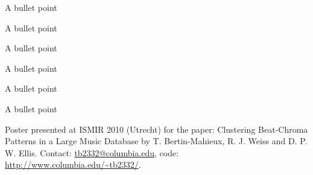 \documentclass[portrait,a0b,final]{a0poster}
\newenvironment{poster}{
  \begin{center}
  \begin{minipage}[c]{0.98\textwidth}
}{
  \end{minipage} 
  \end{center}
}
\newcommand{\pbox}[4]{
\psshadowbox[#3]{
\begin{minipage}[t][#2][t]{#1}
#4
\end{minipage}
}}
\begin{document}
\begin{poster}
\begin{multicols}{3}
\begin{list}{}{\leftmargin=2em =1em}
\item A bullet point
\item A bullet point
\item A bullet point
\item A bullet point
\end{list}


\vspace{0cm}
\begin{center}
  \pbox{0.8\columnwidth}{}{linewidth=2mm,framearc=0.1,linecolor=lightred,fillstyle=gradient,gradangle=0,gradbegin=white,gradend=whitepink,gradmidpoint=1.0,framesep=1em}{
    \begin{center}
      \large Conclusion
    \end{center}}
\end{center}

\vspace{1.0cm}

\begin{list}{}{\leftmargin=2em =1em}
\item A bullet point
\item A bullet point
\end{list}




\begin{small}


\end{small}

\end{multicols}

\vspace{1cm}
\begin{minipage}{\textwidth}
\begin{small}
\begin{flushright}
Poster presented at ISMIR 2010 (Utrecht) for the paper:
Clustering Beat-Chroma Patterns in a Large Music Database by
T. Bertin-Mahieux, R. J. Weiss and D. P. W. Ellis. Contact:
\url{tb2332@columbia.edu}, code: \url{http://www.columbia.edu/~tb2332/}.
\end{flushright}
\end{small}
\end{minipage}

\end{poster}
\end{document}
